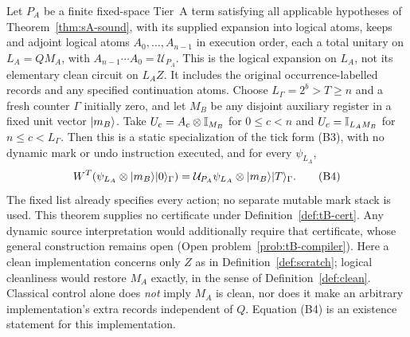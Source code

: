 \begin{theorem}
\label{thm:tB-A}
Let $P_A$ be a finite fixed-space Tier~A term satisfying all applicable
hypotheses of Theorem~\ref{thm:sA-sound}, with
its supplied expansion into logical atoms, keeps and adjoint logical
atoms $A_0,\ldots,A_{n-1}$ in execution order, each a total unitary on
$L_A=QM_A$, with $A_{n-1}\cdots A_0=\mathcal U_{P_A}$.
This is the logical expansion on $L_A$, not its elementary clean circuit
on $L_AZ$. It includes the original occurrence-labelled records and
any specified continuation atoms. Choose $L_{\Gamma}=2^b>T\geq n$ and a fresh
counter $\Gamma$ initially zero, and let $M_B$ be any disjoint auxiliary
register in a fixed unit vector $\lvert m_B\rangle$. Take
$U_c=A_c\otimes\mathbb{I}_{M_B}$ for $0\leq c<n$ and
$U_c=\mathbb{I}_{L_AM_B}$ for $n\leq c<L_{\Gamma}$.
Then this is a static specialization of the tick form (B3), with no
dynamic mark or undo instruction executed, and for every $\psi_{L_A}$,
\[
 W^T(\psi_{L_A}\otimes\lvert m_B\rangle\lvert 0\rangle_\Gamma)
 =\mathcal U_{P_A}\psi_{L_A}\otimes\lvert m_B\rangle\lvert T\rangle_\Gamma.
                                                               \tag{B4}
\]
The fixed list already specifies every action; no separate mutable mark
stack is used. This theorem supplies no certificate under
Definition~\ref{def:tB-cert}. Any dynamic source interpretation would
additionally require that certificate, whose general construction remains
open (Open problem~\ref{prob:tB-compiler}).
Here a clean implementation concerns only $Z$ as in
Definition~\ref{def:scratch}; logical cleanliness would restore $M_A$
exactly, in the sense of Definition~\ref{def:clean}.
Classical control alone does \emph{not} imply $M_A$ is clean, nor does it
make an arbitrary implementation's extra records independent of $Q$.
Equation (B4) is an existence statement for this implementation.
\end{theorem}
